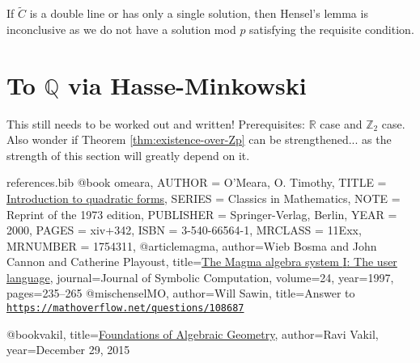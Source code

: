 \documentclass[10pt,a4paper]{amsart}
\numberwithin{equation}{section}
\numberwithin{figure}{section}
\theoremstyle{definition}
\theoremstyle{remark}
\theoremstyle{plain}
\theoremstyle{plain}
\theoremstyle{definition}
\theoremstyle{plain}
\theoremstyle{plain}
\newcommand{\Z}{\mathbb{Z}}
\newcommand{\R}{\mathbb{R}}
\begin{document}
	If $\widetilde{C}$ is a double line or has only a single solution, then Hensel's lemma is inconclusive as we do not have a solution mod $p$ satisfying the requisite condition.

    \section{To $\mathbb{Q}$ via Hasse-Minkowski}\label{sec:hasse-minkowski}
    
    This still needs to be worked out and written! Prerequisites: $\R$ case and $\Z_2$ case. Also wonder if Theorem \ref{thm:existence-over-Zp} can be strengthened... as the strength of this section will greatly depend on it.

\begin{filecontents}{references.bib}
@book {omeara,
    AUTHOR = {O'Meara, O. Timothy},
     TITLE = {\href{https://link.springer.com/book/10.1007\%2F978-3-642-62031-7}{Introduction to quadratic forms}},
    SERIES = {Classics in Mathematics},
      NOTE = {Reprint of the 1973 edition},
 PUBLISHER = {Springer-Verlag, Berlin},
      YEAR = {2000},
     PAGES = {xiv+342},
      ISBN = {3-540-66564-1},
   MRCLASS = {11Exx},
  MRNUMBER = {1754311},
}
@article{magma,
author={Wieb Bosma and John Cannon and Catherine Playoust},
title={\href{http://www.sciencedirect.com/science/article/pii/S074771719690125X}{The Magma algebra system {I}: The user language}},
journal={Journal of Symbolic Computation},
volume={24},
year={1997},
pages={235--265}
}
@misc{henselMO,
	author={Will Sawin},
	title={Answer to \href{https://mathoverflow.net/questions/108687}{\texttt{https://mathoverflow.net/questions/108687}}}
}

@book{vakil,
title={\href{http://math.stanford.edu/~vakil/216blog/index.html}{Foundations of Algebraic Geometry}},
author={Ravi Vakil},
year={December 29, 2015}
}
\end{filecontents}



\end{document}
